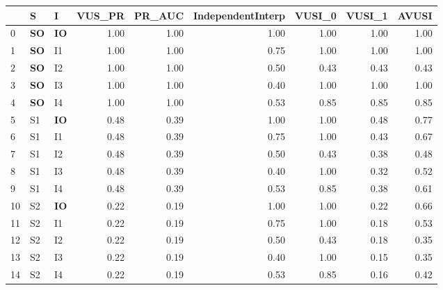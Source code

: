 \begin{tabular}{lllrrrrrr}
\toprule
{} &            S &            I &  VUS_PR &  PR_AUC &  IndependentInterp &  VUSI_0 &  VUSI_1 &  AVUSI \\
\midrule
0  &  \textbf{SO} &  \textbf{IO} &    1.00 &    1.00 &               1.00 &    1.00 &    1.00 &   1.00 \\
1  &  \textbf{SO} &           I1 &    1.00 &    1.00 &               0.75 &    1.00 &    1.00 &   1.00 \\
2  &  \textbf{SO} &           I2 &    1.00 &    1.00 &               0.50 &    0.43 &    0.43 &   0.43 \\
3  &  \textbf{SO} &           I3 &    1.00 &    1.00 &               0.40 &    1.00 &    1.00 &   1.00 \\
4  &  \textbf{SO} &           I4 &    1.00 &    1.00 &               0.53 &    0.85 &    0.85 &   0.85 \\
5  &           S1 &  \textbf{IO} &    0.48 &    0.39 &               1.00 &    1.00 &    0.48 &   0.77 \\
6  &           S1 &           I1 &    0.48 &    0.39 &               0.75 &    1.00 &    0.43 &   0.67 \\
7  &           S1 &           I2 &    0.48 &    0.39 &               0.50 &    0.43 &    0.38 &   0.48 \\
8  &           S1 &           I3 &    0.48 &    0.39 &               0.40 &    1.00 &    0.32 &   0.52 \\
9  &           S1 &           I4 &    0.48 &    0.39 &               0.53 &    0.85 &    0.38 &   0.61 \\
10 &           S2 &  \textbf{IO} &    0.22 &    0.19 &               1.00 &    1.00 &    0.22 &   0.66 \\
11 &           S2 &           I1 &    0.22 &    0.19 &               0.75 &    1.00 &    0.18 &   0.53 \\
12 &           S2 &           I2 &    0.22 &    0.19 &               0.50 &    0.43 &    0.18 &   0.35 \\
13 &           S2 &           I3 &    0.22 &    0.19 &               0.40 &    1.00 &    0.15 &   0.35 \\
14 &           S2 &           I4 &    0.22 &    0.19 &               0.53 &    0.85 &    0.16 &   0.42 \\
\bottomrule
\end{tabular}
